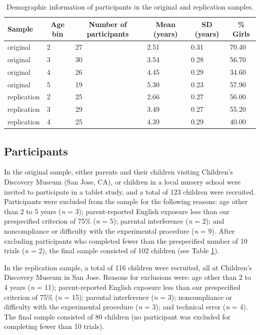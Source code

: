 \documentclass[man]{apa6}
\begin{document}
\begin{table}[tbp]
\begin{center}
\begin{threeparttable}
\caption{\label{tab:participantsummarytab}Demographic information of participants in the original and replication samples.}
\begin{tabular}{llllll}
\toprule
Sample & \multicolumn{1}{c}{Age bin} & \multicolumn{1}{c}{Number of participants} & \multicolumn{1}{c}{Mean (years)} & \multicolumn{1}{c}{SD (years)} & \multicolumn{1}{c}{\% Girls}\\
\midrule
original & 2 & 27 & 2.51 & 0.31 & 70.40\\
original & 3 & 30 & 3.54 & 0.28 & 56.70\\
original & 4 & 26 & 4.45 & 0.29 & 34.60\\
original & 5 & 19 & 5.30 & 0.23 & 57.90\\
replication & 2 & 25 & 2.66 & 0.27 & 56.00\\
replication & 3 & 29 & 3.49 & 0.27 & 55.20\\
replication & 4 & 25 & 4.39 & 0.29 & 40.00\\
\bottomrule
\end{tabular}
\end{threeparttable}
\end{center}
\end{table}

\subsection{Participants}\label{participants}

In the original sample, either parents and their children visiting
Children's Discovery Museum (San Jose, CA), or children in a local
nursery school were invited to participate in a tablet study, and a
total of 123 children were recruited. Participants were excluded from
the sample for the following reasons: age other than 2 to 5 years
(\emph{n} = 3); parent-reported English exposure less than our
prespecified criterion of 75\% (\emph{n} = 5); parental interference
(\emph{n} = 2); and noncompliance or difficulty with the experimental
procedure (\emph{n} = 9). After excluding participants who completed
fewer than the prespecified number of 10 trials (\emph{n} = 2), the
final sample consisted of 102 children (see Table
\ref{tab:participantsummarytab}).

In the replication sample, a total of 116 children were recruited, all
at Children's Discovery Museum in San Jose. Reasons for exclusions were:
age other than 2 to 4 years (\emph{n} = 11); parent-reported English
exposure less than our prespecified criterion of 75\% (\emph{n} = 15);
parental interference (\emph{n} = 3); noncompliance or difficulty with
the experimental procedure (\emph{n} = 3); and technical error (\emph{n}
= 4). The final sample consisted of 80 children (no participant was
excluded for completing fewer than 10 trials).
\end{document}
